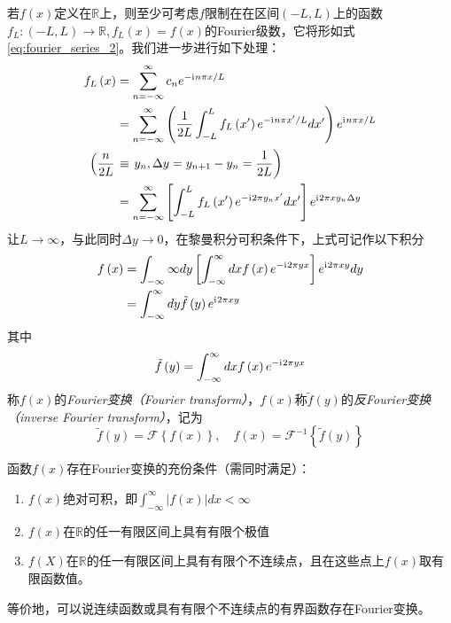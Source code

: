 \documentclass[main.tex]{subfiles}
\begin{document}
若$f\left(x\right)$定义在$\mathbb{R}$上，则至少可考虑$f$限制在在区间$\left(-L,L\right)$上的函数$f_L:\left(-L,L\right)\rightarrow\mathbb{R},f_L\left(x\right)=f\left(x\right)$的Fourier级数，它将形如式\eqref{eq:fourier_series_2}。我们进一步进行如下处理：
\begin{align*}
    f_L\left(x\right)         & =\sum_{n=-\infty}^\infty c_ne^{-\mathrm{i}\mkern1mu n\pi x/L}                                                                                         \\
                              & =\sum_{n=-\infty}^\infty\left(\frac{1}{2L}\int_{-L}^L f_L\left(x^\prime\right)e^{-\mathrm{i}\mkern1mu n\pi x^\prime/L}dx^\prime\right)e^{\mathrm{i}\mkern1mu n\pi x/L} \\
    \left(\frac{n}{2L}\right. & \equiv \left.y_n,\Delta y=y_{n+1}-y_n=\frac{1}{2L}\right)                                                                            \\
                              & =\sum_{n=-\infty}^\infty\left[\int_{-L}^Lf_L\left(x^\prime\right)e^{-\mathrm{i}\mkern1mu 2\pi y_nx^\prime}dx^\prime\right]e^{\mathrm{i}\mkern1mu 2\pi xy_n\Delta y}
\end{align*}
让$L\rightarrow\infty$，与此同时$\Delta y\rightarrow 0$，在黎曼积分可积条件下，上式可记作以下积分
\begin{align}\label{eq:fourier_transform_1}
    f\left(x\right) & =\int_{-\infty}{\infty}dy\left[\int_{-\infty}^\infty dxf\left(x\right)e^{-\mathrm{i}\mkern1mu 2\pi yx}\right]e^{\mathrm{i}\mkern1mu 2\pi xy}dy \\
                    & =\int_{-\infty}^\infty dy\tilde{f}\left(y\right)e^{\mathrm{i}\mkern1mu 2\pi xy}
\end{align}
其中
\[\tilde{f}\left(y\right)=\int_{-\infty}^\infty dxf\left(x\right)e^{-\mathrm{i}\mkern1mu 2\pi yx}\]
称$f\left(x\right)$的\emph{Fourier变换（Fourier transform）}，$f\left(x\right)$称$\tilde{f}\left(y\right)$的\emph{反Fourier变换（inverse Fourier transform）}，记为
\[\tilde{f}\left(y\right)=\mathcal{F}\left\{f\left(x\right)\right\},\quad f\left(x\right)=\mathcal{F}^{-1}\left\{\tilde{f}\left(y\right)\right\}\]

函数$f\left(x\right)$存在Fourier变换的充份条件（需同时满足）：
\begin{enumerate}
    \item $f\left(x\right)$绝对可积，即$\int_{-\infty}^{\infty}\left|f\left(x\right)\right|dx<\infty$
    \item $f\left(x\right)$在$\mathbb{R}$的任一有限区间上具有有限个极值
    \item $f\left(X\right)$在$\mathbb{R}$的任一有限区间上具有有限个不连续点，且在这些点上$f\left(x\right)$取有限函数值。
\end{enumerate}
等价地，可以说连续函数或具有有限个不连续点的有界函数存在Fourier变换。
\end{document}
